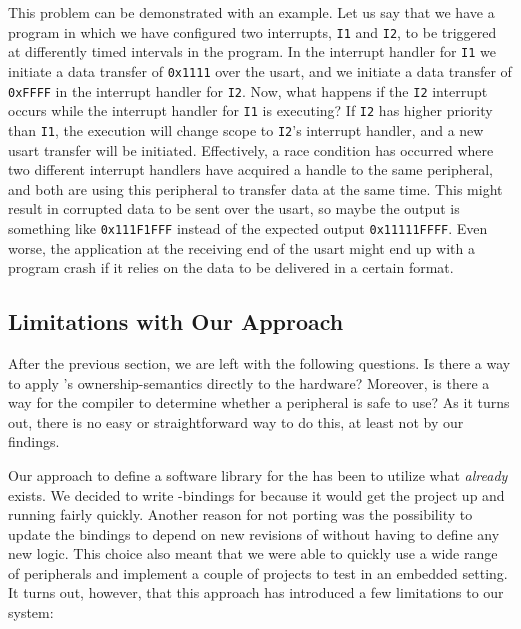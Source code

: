 This problem can be demonstrated with an example.
Let us say that we have a program in which we have configured two interrupts, \texttt{I1} and \texttt{I2}, to be triggered at differently timed intervals in the program.
In the interrupt handler for \texttt{I1} we initiate a data transfer of \texttt{0x1111} over the \gls{usart}, and we initiate a data transfer of \texttt{0xFFFF} in the interrupt handler for \texttt{I2}.
Now, what happens if the \texttt{I2} interrupt occurs while the interrupt handler for \texttt{I1} is executing?
If \texttt{I2} has higher priority than \texttt{I1}, the execution will change scope to \texttt{I2}'s interrupt handler, and a new \gls{usart} transfer will be initiated.
Effectively, a race condition has occurred where two different interrupt handlers have acquired a handle to the same peripheral, and both are using this peripheral to transfer data at the same time.
This might result in corrupted data to be sent over the \gls{usart}, so maybe the output is something like \texttt{0x111F1FFF} instead of the expected output \texttt{0x11111FFFF}.
Even worse, the application at the receiving end of the \gls{usart} might end up with a program crash if it relies on the data to be delivered in a certain format.

\subsection{Limitations with Our Approach}

After the previous section, we are left with the following questions.
Is there a way to apply {\rust}'s ownership-semantics directly to the hardware?
Moreover, is there a way for the {\rust} compiler to determine whether a peripheral is safe to use?
As it turns out, there is no easy or straightforward way to do this, at least not by our findings.

Our approach to define a software library for the {\gecko} has been to utilize what \emph{already} exists.
We decided to write {\rust}-bindings for {\emlib} because it would get the project up and running fairly quickly.
Another reason for not porting {\emlib} was the possibility to update the bindings to depend on new revisions of {\emlib} without having to define any new logic.
This choice also meant that we were able to quickly use a wide range of peripherals and implement a couple of projects to test {\rust} in an embedded setting.
It turns out, however, that this approach has introduced a few limitations to our system:

